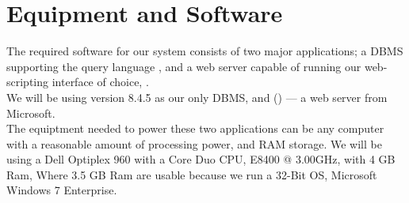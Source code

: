 \section{Equipment and Software}
\label{sec:equipmentsoftware}

The required software for our system consists of two major applications; a DBMS supporting the query language \sql[], and a web server capable of running our web-scripting interface of choice, \aspnet[].\\
We will be using \posgresql[] version 8.4.5 as our only DBMS, and  \wholeiis[] (\iis[]) --- a web server from Microsoft.\\

The equiptment needed to power these two applications can be any computer with a reasonable amount of processing power, and RAM storage. We will be using a Dell Optiplex 960 with a Core Duo CPU, E8400 @ 3.00GHz, with 4 GB Ram, Where 3.5 GB Ram are usable because we run a 32-Bit OS, Microsoft Windows 7 Enterprise.